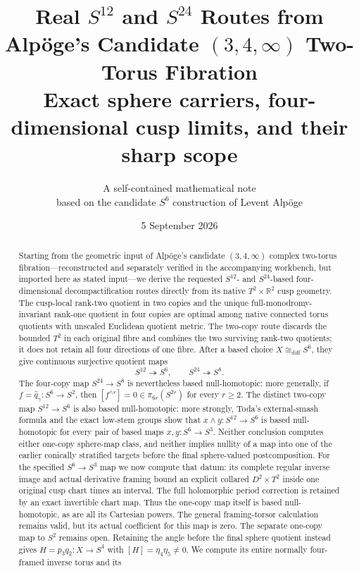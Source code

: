 \documentclass[11pt,letterpaper]{article}
\title{Real \(S^{12}\) and \(S^{24}\) Routes from Alp\"oge's Candidate
\((3,4,\infty)\) Two-Torus Fibration\\
\large Exact sphere carriers, four-dimensional cusp limits, and their sharp scope}
\author{A self-contained mathematical note\\
\small based on the candidate $S^6$ construction of Levent Alp\"oge}
\date{5 September 2026}
\numberwithin{equation}{section}
\theoremstyle{definition}
\theoremstyle{remark}
\newcommand{\R}{\mathbb R}
\begin{document}
\maketitle

\begin{abstract}
Starting from the geometric input of Alp\"oge's candidate
\((3,4,\infty)\) complex two-torus fibration---reconstructed and separately
verified in the accompanying workbench, but imported here as stated
input---we derive the requested
\(S^{12}\)- and \(S^{24}\)-based four-dimensional decompactification
routes directly from its native \(T^2\times\R^2\) cusp geometry.  The
cusp-local rank-two quotient in two copies and the unique
  full-monodromy-invariant rank-one quotient in four copies are optimal among
  native connected torus quotients with unscaled Euclidean quotient metric.
  The two-copy route discards the bounded \(T^2\) in each original fibre and
  combines the two surviving rank-two quotients; it does not retain all four
  directions of one fibre.  After a based choice
  \(X\cong_{\mathrm{diff}}S^6\), they give continuous
surjective quotient maps
\[
 S^{12}\twoheadrightarrow S^6,\qquad
 S^{24}\twoheadrightarrow S^8.
\]
The four-copy map \(S^{24}\to S^8\) is nevertheless based
null-homotopic: more generally, if
\(f=\widehat q_\gamma:S^6\to S^2\), then
\([f^{\wedge r}]=0\in\pi_{6r}(S^{2r})\) for every \(r\geq2\).
The distinct two-copy map \(S^{12}\to S^6\) is also based
null-homotopic: more strongly, Toda's external-smash formula and the exact
low-stem groups show that \(x\wedge y:S^{12}\to S^6\) is based
null-homotopic for every pair of based maps \(x,y:S^6\to S^3\).
Neither conclusion computes either one-copy sphere-map class, and neither
implies nullity of a map into one of the earlier conically stratified
targets before the final sphere-valued postcomposition.
For the specified \(S^6\to S^3\) map we now compute that datum:
its complete regular inverse image and actual derivative framing bound
an explicit collared \(D^2\times T^2\) inside one original cusp chart
times an interval. The full holomorphic period correction is retained
by an exact invertible chart map. Thus the one-copy map itself is
based null-homotopic, as are all its Cartesian powers. The general
framing-torsor calculation remains valid, but its actual coefficient
for this map is zero. The separate one-copy map to \(S^2\) remains open.
Retaining the angle before the final sphere quotient instead gives
\(H=p_3q_2:X\to S^4\) with \([H]=\eta_4\eta_5\ne0\).
We compute its entire normally four-framed inverse torus and its

\end{abstract}
\end{document}
